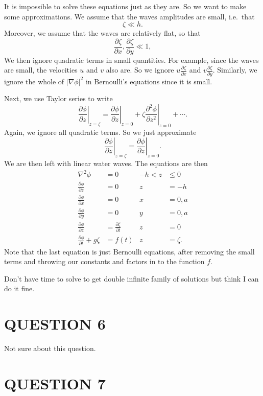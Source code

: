 \documentclass[a4paper]{article}
\begin{document}
It is impossible to solve these equations just as they are. So we want to make some approximations. We assume that the waves amplitudes are small, i.e.\ that
\[
\zeta \ll h.
\]
Moreover, we assume that the waves are relatively flat, so that
\[
\frac{\partial \zeta}{\partial x},\frac{\partial \zeta}{\partial y} \ll 1,
\]
We then ignore quadratic terms in small quantities. For example, since the waves are small, the velocities $u$ and $v$ also are. So we ignore $u \frac{\partial \zeta}{\partial x}$ and $v\frac{\partial \zeta}{\partial y}$. Similarly, we ignore the whole of $|\nabla \phi|^2$ in Bernoulli's equations since it is small.

Next, we use Taylor series to write
\[
\left.\frac{\partial \phi}{\partial z}\right|_{z = \zeta} = \left.\frac{\partial \phi}{\partial z}\right|_{z = 0} + \zeta \left.\frac{\partial^2 \phi}{\partial z^2}\right|_{z = 0} + \cdots.
\]
Again, we ignore all quadratic terms. So we just approximate
\[
\left.\frac{\partial \phi}{\partial z}\right|_{z = \zeta} = \left.\frac{\partial \phi}{\partial z}\right|_{z = 0}.
\]
We are then left with linear water waves. The equations are then
\begin{align*}
\nabla^2 \phi &= 0 & -h < z &\leq 0\\
\frac{\partial \phi}{\partial z} &= 0 & z &= -h\\
\frac{\partial \phi}{\partial x} &= 0 & x &= 0,a\\
\frac{\partial \phi}{\partial y} &= 0 & y &= 0,a\\
\frac{\partial \phi}{\partial z} &= \frac{\partial \zeta}{\partial t} & z &= 0\\
\frac{\partial \phi}{\partial t} + g\zeta &= f(t) & z &= \zeta.
\end{align*}
Note that the last equation is just Bernoulli equations, after removing the small terms and throwing our constants and factors in to the function $f$.

Don't have time to solve to get double infinite family of solutions but think I can do it fine. 


\section{QUESTION 6}

Not sure about this question.

\section{QUESTION 7}
\end{document}

